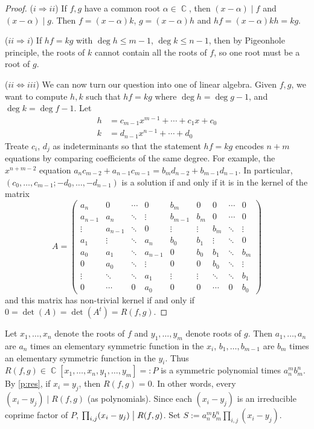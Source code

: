 \documentclass[11pt, a4paper]{memoir}
\DeclareMathOperator{\C}{{\mathbb{C}}}
\newcommand{\impendc}{\hspace{0.3cm}}
\newcommand{\iimp}[2]{($#1\Rightarrow#2$)}
\newcommand{\iimpe}[2]{($#1\Leftrightarrow#2$)}
\newcommand{\imp}[2]{\iimp{#1}{#2}\impendc}
\newcommand{\impe}[2]{\iimpe{#1}{#2}\impendc}
\renewcommand{\div}{\bigm|}
\theoremstyle{change}
\theoremstyle{plain}
\theoremstyle{nonumberplain}
\newtheorem{proof}{Proof}
\numberwithin{equation}{section}
\begin{document}
\begin{proof}
    \imp{i}{ii} If $f,g$ have a common root $\alpha\in\C$, then $(x-\alpha)\mid f$ and $(x-\alpha)\mid g$.
    Then $f=(x-\alpha)k$, $g=(x-\alpha)h$ and $hf=(x-\alpha)kh=kg$.

    \imp{ii}{i} If $hf=kg$ with $\deg h\leq m-1$, $\deg k\leq n-1$, then by Pigeonhole principle, the roots of $k$ cannot contain all the roots of $f$, so one root must be a root of $g$.

    \impe{ii}{iii} We can now turn our question into one of linear algebra.
    Given $f,g$, we want to compute $h,k$ such that $hf=kg$ where $\deg h=\deg g-1$, and $\deg k =\deg f-1$.
    Let
    \begin{align*}
        h&=c_{m-1}x^{m-1}+\cdots+c_1x+c_0\\
        k&=d_{n-1}x^{n-1}+\cdots+d_0
    \end{align*}
    Treate $c_i$, $d_j$ as indeterminants so that the statement $hf=kg$ encodes $n+m$ equations by comparing coefficients of the same degree.
    For example, the $x^{n+m-2}$ equation $a_nc_{m-2}+a_{n-1}c_{m-1}=b_md_{n-2}+b_{m-1}d_{n-1}$.
    In particular, $(c_0,\ldots,c_{m-1};-d_0,\ldots,-d_{n-1})$ is a solution if and only if it is in the kernel of the matrix
    \begin{equation*}
        A=
        \begin{pmatrix}
            a_n&0&\cdots&0&b_m&0&0&\cdots&0\\
            a_{n-1}&a_n&\ddots&\vdots&b_{m-1}&b_m&0&\cdots&0\\
            \vdots&a_{n-1}&\ddots&0&\vdots&\vdots&b_m&\ddots&\vdots\\
            a_1&\vdots&\ddots&a_n&b_0&b_1&\vdots&\ddots&0\\
            a_0&a_1&\ddots&a_{n-1}&0&b_0&b_1&\ddots&b_m\\
            0&a_0&\ddots&\vdots&0&0&b_0&\ddots&\vdots\\
            \vdots&\ddots&\ddots&a_1&\vdots&\vdots&\ddots&\ddots&b_1\\
            0&\cdots&0&a_0&0&0&\cdots&0&b_0
        \end{pmatrix}
    \end{equation*}
    and this matrix has non-trivial kernel if and only if $0=\det(A)=\det(A^t)=R(f,g)$.
\end{proof}
Let $x_1,\ldots,x_n$ denote the roots of $f$ and $y_1,\ldots,y_m$ denote roots of $g$.
Then $a_1,\ldots,a_n$ are $a_n$ times an elementary symmetric function in the $x_i$, $b_1,\ldots,b_{m-1}$ are $b_m$ times an elementary symmetric function in the $y_i$.
Thus $R(f,g)\in \C[x_1,\ldots,x_n,y_1,\ldots,y_m]=:P$ is a symmetric polynomial times $a_n^mb_m^n$.
By \cref{p:res}, if $x_i=y_j$, then $R(f,g)=0$.
In other words, every $(x_i-y_j)\mid R(f,g)$ (as polynomials).
Since each $(x_i-y_j)$ is an irreducible coprime factor of $P$, $\prod_{i,j}(x_i-y_j)\div R(f,g)$.
Set $S:=a_n^mb_m^n\prod_{i,j}(x_i-y_j)$.
\end{document}
